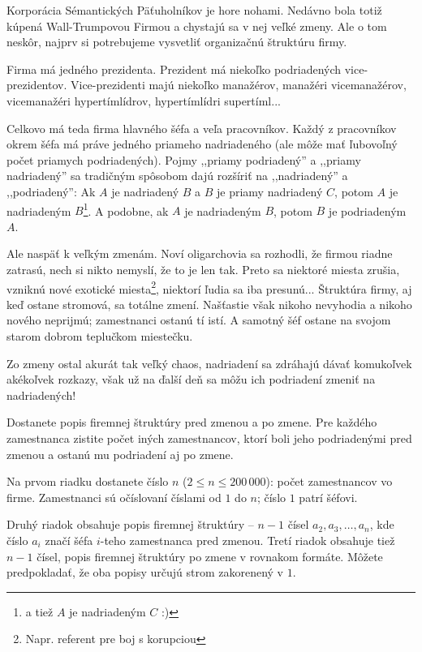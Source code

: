 
\usepackage[slovak]{babel}




Korporácia Sémantických Päťuholníkov je hore nohami. Nedávno bola totiž
kúpená Wall-Trumpovou Firmou a chystajú sa v nej veľké zmeny. Ale o tom neskôr,
najprv si potrebujeme vysvetliť organizačnú štruktúru firmy.

Firma má jedného prezidenta. Prezident má niekoľko podriadených vice-prezidentov.
Vice-prezidenti majú niekoľko manažérov, manažéri vicemanažérov, vicemanažéri
hypertímlídrov, hypertímlídri supertíml...

Celkovo má teda firma hlavného šéfa a veľa pracovníkov. Každý z pracovníkov okrem šéfa
má práve jedného priameho nadriadeného (ale môže mať ľubovoľný počet priamych 
podriadených). Pojmy ,,priamy podriadený'' a ,,priamy nadriadený'' sa tradičným spôsobom
dajú rozšíriť na ,,nadriadený'' a ,,podriadený'': Ak $A$ je nadriadený $B$ a $B$
je priamy nadriadený $C$, potom $A$
je nadriadeným $B$\footnote{a tiež $A$ je nadriadeným $C$ :)}. A podobne, ak $A$ je nadriadeným $B$, potom $B$ je podriadeným $A$.

Ale naspäť k veľkým zmenám. Noví oligarchovia sa rozhodli, že firmou riadne zatrasú,
nech si nikto nemyslí, že to je len tak. Preto sa niektoré miesta zrušia,
vzniknú nové exotické miesta\footnote{Napr. referent pre boj s korupciou}, niektorí ľudia sa iba
presunú... Štruktúra firmy, aj keď ostane stromová, sa totálne
zmení. Našťastie však nikoho nevyhodia a nikoho nového neprijmú; zamestnanci ostanú
tí istí. A samotný šéf ostane na svojom starom dobrom teplučkom miestečku.

Zo zmeny ostal akurát tak veľký chaos, nadriadení sa zdráhajú dávať komukoľvek
akékoľvek rozkazy, však už na ďalší deň sa môžu ich podriadení zmeniť na
nadriadených!


Dostanete popis firemnej štruktúry pred zmenou a po zmene. Pre každého zamestnanca
zistite počet iných zamestnancov, ktorí boli jeho podriadenými pred zmenou a ostanú
mu podriadení aj po zmene.


Na prvom riadku dostanete číslo $n$ ($2 \leq n \leq 200\,000$): počet zamestnancov vo firme.
Zamestnanci sú očíslovaní číslami od $1$ do $n$; číslo $1$ patrí šéfovi.

Druhý riadok obsahuje popis firemnej štruktúry -- $n-1$ čísel $a_2, a_3, \ldots, a_n$, kde
číslo $a_i$ značí šéfa $i$-teho zamestnanca pred zmenou. Tretí riadok obsahuje tiež $n-1$
čísel, popis firemnej štruktúry po zmene v rovnakom formáte. Môžete predpokladať, že oba
popisy určujú strom zakorenený v $1$.

